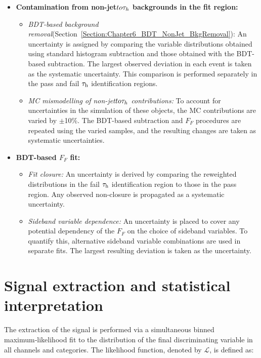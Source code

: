 \begin{itemize}
    \item \textbf{Contamination from non-jet$to\tau_h$ backgrounds in the fit region:}
    \begin{itemize}
        \item \textit{BDT-based background removal}(Section~\ref{Section:Chapter6_BDT_NonJet_BkgRemoval}): An uncertainty is assigned by comparing the variable distributions obtained using standard histogram subtraction and those obtained with the BDT-based subtraction. The largest observed deviation in each event is taken as the systematic uncertainty. This comparison is performed separately in the pass and fail $\tau_\mathrm{h}$ identification regions.
        \item \textit{MC mismodelling of non-jet$to\tau_h$ contributions:} To account for uncertainties in the simulation of these objects, the MC contributions are varied by $\pm$10\%. The BDT-based subtraction and $F_F$ procedures are repeated using the varied samples, and the resulting changes are taken as systematic uncertainties.
    \end{itemize}

    \item \textbf{BDT-based $F_F$ fit:}
    \begin{itemize}
        \item \textit{Fit closure:} An uncertainty is derived by comparing the reweighted distributions in the fail $\tau_\mathrm{h}$ identification region to those in the pass region. Any observed non-closure is propagated as a systematic uncertainty.
        \item \textit{Sideband variable dependence:} An uncertainty is placed to cover any potential dependency of the $F_F$ on the choice of sideband variables. To quantify this, alternative sideband variable combinations are used in separate fits. The largest resulting deviation is taken as the uncertainty.
    \end{itemize}
\end{itemize}

\section{Signal extraction and statistical interpretation}
\label{Section:Chapter6_SignalExtraction}

The extraction of the signal is performed via a simultaneous binned maximum‑likelihood fit to the distribution of the final discriminating variable in all channels and categories. The likelihood function, denoted by $\mathscr{L}$, is defined as:

